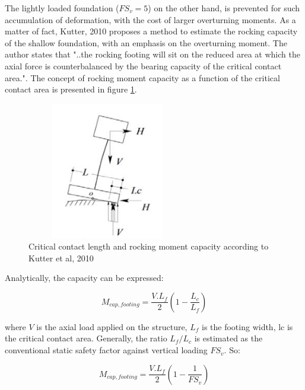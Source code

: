 The lightly loaded foundation ($FS_v=5$) on the other hand, is prevented for such accumulation of deformation, with the cost of larger overturning moments. As a matter of fact, Kutter, 2010 \cite{kutter2010estimation} proposes a method to estimate the rocking capacity of the shallow foundation, with an emphasis on the overturning moment. The author states that "..the rocking footing will sit on the reduced area at which the axial force is counterbalanced by the bearing capacity of the critical contact area.". The concept of rocking moment capacity as a function of the critical contact area is presented in figure \ref{rocking_cap}.
 \begin{figure}
 	\centering
 	\includegraphics[width=7cm,height=6cm, keepaspectratio]{"rocking_cap"}
 	\caption{Critical contact length and rocking moment capacity according to \mbox{Kutter} et al, 2010}
 	\label{rocking_cap}
 \end{figure}
 
 Analytically, the capacity can be expressed: 
 
 \begin{equation}
 M_{cap,footing} = \frac{V.L_f}{2}(1-\frac{L_c}{L_f})
 \end{equation}
 
 where $V$ is the axial load applied on the structure, $L_f$ is the footing width, \gls{lc} is the critical contact area. Generally, the ratio $L_f/L_c$ is estimated as the conventional static safety factor against vertical loading $FS_v$. So:
 
 \begin{equation}
 M_{cap,footing} = \frac{V.L_f}{2}(1-\frac{1}{FS_v})
 \end{equation} 	
 
